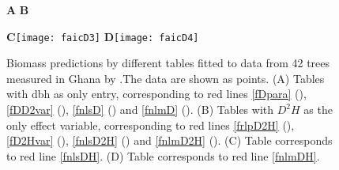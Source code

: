 \begin{figure}[htbp]
\begin{center}
{\sffamily\bfseries A}%
{\sffamily\bfseries B}\par\bigskip%
{\sffamily\bfseries C}\texttt{[image: faicD3]}%
{\sffamily\bfseries D}\texttt{[image: faicD4]}%
\end{center}
\caption[Biomass predictions by different tables fitted to data from 42 trees measured in Ghana by
\citet{henry10}]{Biomass predictions by different tables fitted to data from 42 trees measured in Ghana by
\citet{henry10}.The data are shown as points. (A)
Tables with dbh as only entry, corresponding to red lines \ref{fDpara} (), \ref{fDD2var} (), \ref{fnlsD}
() and \ref{fnlmD}
(). (B) Tables with $D^2H$
as the only effect variable, corresponding to red lines \ref{frlpD2H} (), \ref{fD2Hvar} (), \ref{fnlsD2H}
() and \ref{fnlmD2H}
(). (C) Table corresponds to red line \ref{fnlsDH}. (D) Table corresponds to red line \ref{fnlmDH}.\label{fpredB}}
\end{figure}


